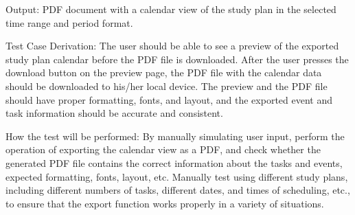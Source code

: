 \documentclass[12pt, titlepage]{article}
\begin{document}
\begin{enumerate}
Output: PDF document with a calendar view of the study plan in the selected time range and period format.

Test Case Derivation: The user should be able to see a preview of the exported study plan calendar before the PDF file is downloaded. After the user presses the download button on the preview page, the PDF file with the calendar data should be downloaded to his/her local device. The preview and the PDF file should have proper formatting, fonts, and layout, and the exported event and task information should be accurate and consistent.
					
How the test will be performed: By manually simulating user input, perform the operation of exporting the calendar view as a PDF, and check whether the generated PDF file contains the correct information about the tasks and events, expected formatting, fonts, layout, etc. Manually test using different study plans, including different numbers of tasks, different dates, and times of scheduling, etc., to ensure that the export function works properly in a variety of situations.

\end{enumerate}
\end{document}
